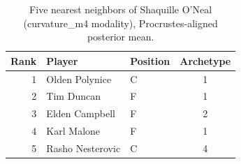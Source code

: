 \begin{table}[htbp]
  \centering\small
  \begin{tabular}{rllc}
    \toprule
    Rank & Player & Position & Archetype \\
    \midrule
    1 & Olden Polynice & C & 1 \\
    2 & Tim Duncan & F & 1 \\
    3 & Elden Campbell & F & 2 \\
    4 & Karl Malone & F & 1 \\
    5 & Rasho Nesterovic & C & 4 \\
    \bottomrule
  \end{tabular}
  \caption{Five nearest neighbors of Shaquille O'Neal (curvature_m4 modality), Procrustes-aligned posterior mean.}
  \label{tab:Shaquille_O_Neal_neighbors_curvature_m4}
\end{table}

